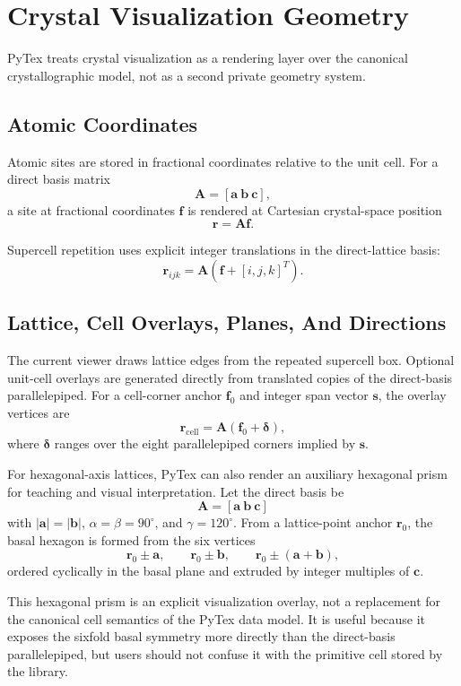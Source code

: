 \section{Crystal Visualization Geometry}

PyTex treats crystal visualization as a rendering layer over the canonical crystallographic model, not as a second private geometry system.

\subsection{Atomic Coordinates}

Atomic sites are stored in fractional coordinates relative to the unit cell. For a direct basis matrix
\[
\mathbf{A} = [\mathbf{a}\ \mathbf{b}\ \mathbf{c}],
\]
a site at fractional coordinates $\mathbf{f}$ is rendered at Cartesian crystal-space position
\[
\mathbf{r} = \mathbf{A}\mathbf{f}.
\]

Supercell repetition uses explicit integer translations in the direct-lattice basis:
\[
\mathbf{r}_{ijk} = \mathbf{A}(\mathbf{f} + [i, j, k]^T).
\]

\subsection{Lattice, Cell Overlays, Planes, And Directions}

The current viewer draws lattice edges from the repeated supercell box. Optional unit-cell overlays are generated directly from translated copies of the direct-basis parallelepiped. For a cell-corner anchor $\mathbf{f}_0$ and integer span vector $\mathbf{s}$, the overlay vertices are
\[
\mathbf{r}_{\mathrm{cell}} = \mathbf{A}(\mathbf{f}_0 + \boldsymbol{\delta}),
\]
where $\boldsymbol{\delta}$ ranges over the eight parallelepiped corners implied by $\mathbf{s}$.

For hexagonal-axis lattices, PyTex can also render an auxiliary hexagonal prism for teaching and visual interpretation. Let the direct basis be
\[
\mathbf{A} = [\mathbf{a}\ \mathbf{b}\ \mathbf{c}]
\]
with $|\mathbf{a}| = |\mathbf{b}|$, $\alpha = \beta = 90^{\circ}$, and $\gamma = 120^{\circ}$. From a lattice-point anchor $\mathbf{r}_0$, the basal hexagon is formed from the six vertices
\[
\mathbf{r}_0 \pm \mathbf{a},\qquad
\mathbf{r}_0 \pm \mathbf{b},\qquad
\mathbf{r}_0 \pm (\mathbf{a}+\mathbf{b}),
\]
ordered cyclically in the basal plane and extruded by integer multiples of $\mathbf{c}$.

This hexagonal prism is an explicit visualization overlay, not a replacement for the canonical cell semantics of the PyTex data model. It is useful because it exposes the sixfold basal symmetry more directly than the direct-basis parallelepiped, but users should not confuse it with the primitive cell stored by the library.

